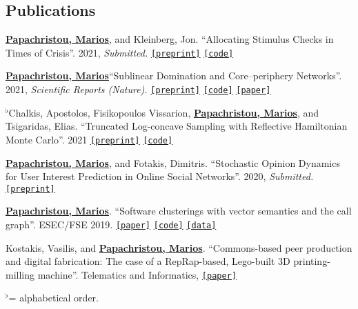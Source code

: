\documentclass[margin, 10pt]{res}
\newcommand{\alphabeticalorder}[0]{\ensuremath  {^\flat}}
\newcommand{\specialurl}[2]{\href { #2 } {\nolinkurl{[#1]}}}
\newcommand{\preprint}[1]{\specialurl {preprint} {#1}}
\newcommand{\code}[1]{\specialurl {code} {#1}}
\newcommand{\data}[1]{\specialurl {data} {#1}}
\newcommand{\paper}[1]{\specialurl {paper} {#1}}
\newcommand{\authorref}[1]{\underline {\textbf{#1}}}
\newcommand{\authorme}{\authorref{Papachristou, Marios}}
\begin{document}
\begin{resume}
\section{Publications}

\begin{compactenum}
    
   \item  \authorme, and Kleinberg, Jon. ``Allocating Stimulus Checks in Times of Crisis''. 2021, \emph{Submitted.} \preprint{https://arxiv.org/abs/2106.07560} \code{https://github.com/papachristoumarios/financial-contagion}     
   \item \authorme ``Sublinear Domination and Core--periphery Networks''. 2021,  \emph{Scientific Reports (Nature).}  \preprint{https://arxiv.org/abs/2103.03135} \code{https://bit.ly/3wKNGI0} \paper{http://www.nature.com/articles/s41598-021-94105-8}
    \item \alphabeticalorder Chalkis, Apostolos, Fisikopoulos Vissarion, \authorme, and Tsigaridas, Elias. ``Truncated Log-concave Sampling with Reflective Hamiltonian Monte Carlo''. 2021 \preprint{https://arxiv.org/abs/2102.13068} \code{https://github.com/GeomScale/volume_approximation}
    \item \authorme, and Fotakis, Dimitris. ``Stochastic Opinion Dynamics for User Interest Prediction in Online Social Networks''. 2020, \emph{Submitted.}  \preprint{https://www.researchgate.net/publication/353006940_Stochastic_Opinion_Dynamics_for_Interest_Prediction_in_Social_Networks}
    \item \authorme. ``Software clusterings with vector semantics and the call graph''. ESEC/FSE 2019.  \paper{https://dl.acm.org/citation.cfm?id=3342483} \code{https://github.com/papachristoumarios/sade} \data{http://doi.org/10.5281/zenodo.2652487}
    \item Kostakis, Vasilis, and \authorme. ``Commons-based peer production and digital fabrication: The case of a RepRap-based, Lego-built 3D printing-milling machine''. Telematics and Informatics,  \paper{https://bit.ly/2JRoisV} 
    
\end{compactenum}

\alphabeticalorder  = alphabetical order.


\end{resume}
\end{document}
